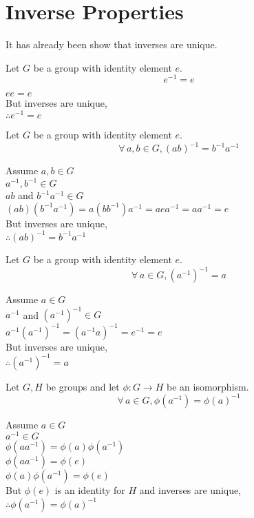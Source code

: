 \documentclass[letterpaper,12pt,fleqn]{article}
\newcommand{\p}{\phi}
\begin{document}
\section*{Inverse Properties}

It has already been show that inverses are unique.

\begin{theorem}
  Let $G$ be a group with identity element $e$.
  \[e^{-1}=e\]
\end{theorem}

\begin{theproof}
  $ee=e$ \\
  But inverses are unique, \\
  $\therefore e^{-1}=e$
\end{theproof}

\begin{theorem}
  Let $G$ be a group with identity element $e$.
  \[\forall\,a,b\in G,(ab)^{-1}=b^{-1}a^{-1}\]
\end{theorem}

\begin{theproof}
  Assume $a,b\in G$ \\
  $a^{-1},b^{-1}\in G$ \\
  $ab$ and $b^{-1}a^{-1}\in G$ \\
  $(ab)(b^{-1}a^{-1})=a(bb^{-1})a^{-1}=aea^{-1}=aa^{-1}=e$ \\
  But inverses are unique, \\
  $\therefore (ab)^{-1}=b^{-1}a^{-1}$
\end{theproof}

\begin{theorem}
  Let $G$ be a group with identity element $e$.
  \[\forall\,a\in G,\left(a^{-1}\right)^{-1}=a\]
\end{theorem}

\begin{theproof}
  Assume $a\in G$ \\
  $a^{-1}$ and $\left(a^{-1}\right)^{-1}\in G$ \\
  $a^{-1}\left(a^{-1}\right)^{-1}=\left(a^{-1}a\right)^{-1}=e^{-1}=e$ \\
  But inverses are unique, \\
  $\therefore \left(a^{-1}\right)^{-1}=a$
\end{theproof}

\begin{theorem}
  Let $G,H$ be groups and let $\p:G\to H$ be an isomorphism.
  \[\forall\,a\in G,\p(a^{-1})=\p(a)^{-1}\]
\end{theorem}

\begin{theproof}
  Assume $a\in G$ \\
  $a^{-1}\in G$ \\
  $\p(aa^{-1})=\p(a)\p(a^{-1})$ \\
  $\p(aa^{-1})=\p(e)$ \\
  $\p(a)\p(a^{-1})=\p(e)$ \\
  But $\p(e)$ is an identity for $H$ and inverses are unique, \\
  $\therefore \p(a^{-1})=\p(a)^{-1}$
\end{theproof}
\end{document}
